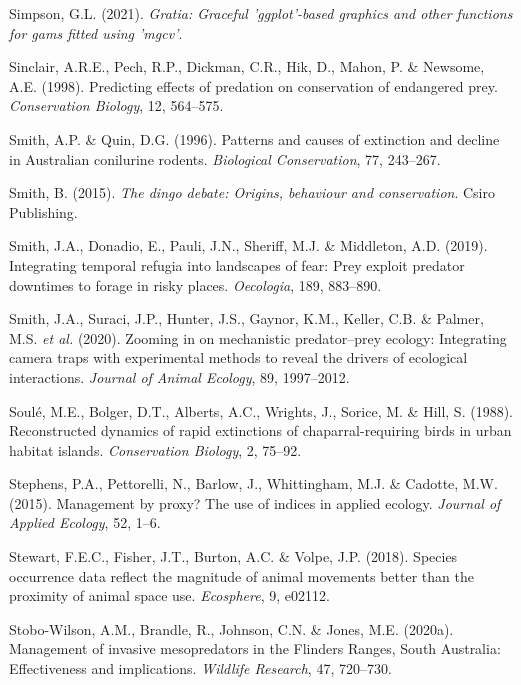 \documentclass[11pt,a4paper,titlepage,twoside,openright]{style/unimelbthesis}
\begin{document}
\begin{mainmatter}
\leavevmode\hypertarget{ref-gratia}{}%
Simpson, G.L. (2021). \emph{Gratia: Graceful 'ggplot'-based graphics and other functions for gams fitted using 'mgcv'}.

\leavevmode\hypertarget{ref-sinclair1998predicting}{}%
Sinclair, A.R.E., Pech, R.P., Dickman, C.R., Hik, D., Mahon, P. \& Newsome, A.E. (1998). Predicting effects of predation on conservation of endangered prey. \emph{Conservation Biology}, 12, 564--575.

\leavevmode\hypertarget{ref-smith1996patterns}{}%
Smith, A.P. \& Quin, D.G. (1996). Patterns and causes of extinction and decline in Australian conilurine rodents. \emph{Biological Conservation}, 77, 243--267.

\leavevmode\hypertarget{ref-smith2015dingo}{}%
Smith, B. (2015). \emph{The dingo debate: Origins, behaviour and conservation}. Csiro Publishing.

\leavevmode\hypertarget{ref-smith2019integrating}{}%
Smith, J.A., Donadio, E., Pauli, J.N., Sheriff, M.J. \& Middleton, A.D. (2019). Integrating temporal refugia into landscapes of fear: Prey exploit predator downtimes to forage in risky places. \emph{Oecologia}, 189, 883--890.

\leavevmode\hypertarget{ref-smith2020zooming}{}%
Smith, J.A., Suraci, J.P., Hunter, J.S., Gaynor, K.M., Keller, C.B. \& Palmer, M.S. \emph{et al.} (2020). Zooming in on mechanistic predator--prey ecology: Integrating camera traps with experimental methods to reveal the drivers of ecological interactions. \emph{Journal of Animal Ecology}, 89, 1997--2012.

\leavevmode\hypertarget{ref-soule1988reconstructed}{}%
Soulé, M.E., Bolger, D.T., Alberts, A.C., Wrights, J., Sorice, M. \& Hill, S. (1988). Reconstructed dynamics of rapid extinctions of chaparral-requiring birds in urban habitat islands. \emph{Conservation Biology}, 2, 75--92.

\leavevmode\hypertarget{ref-stephens2015management}{}%
Stephens, P.A., Pettorelli, N., Barlow, J., Whittingham, M.J. \& Cadotte, M.W. (2015). Management by proxy? The use of indices in applied ecology. \emph{Journal of Applied Ecology}, 52, 1--6.

\leavevmode\hypertarget{ref-stewart2018species}{}%
Stewart, F.E.C., Fisher, J.T., Burton, A.C. \& Volpe, J.P. (2018). Species occurrence data reflect the magnitude of animal movements better than the proximity of animal space use. \emph{Ecosphere}, 9, e02112.

\leavevmode\hypertarget{ref-stobo2020management}{}%
Stobo-Wilson, A.M., Brandle, R., Johnson, C.N. \& Jones, M.E. (2020a). Management of invasive mesopredators in the Flinders Ranges, South Australia: Effectiveness and implications. \emph{Wildlife Research}, 47, 720--730.


\end{mainmatter}
\end{document}
